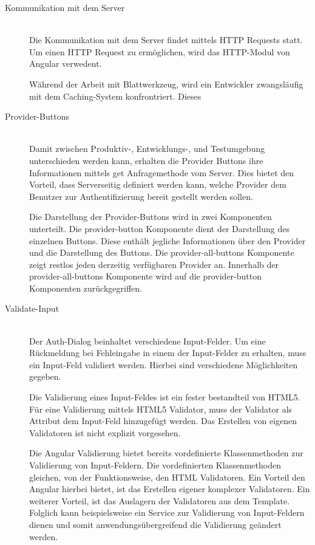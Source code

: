 \begin{description}
	\item[Kommunikation mit dem Server]\hfill\\
	Die Kommunikation mit dem Server findet mittels \gls{HTTP} Requests statt. Um einen \gls{HTTP} Request zu ermöglichen, wird das \gls{HTTP}-Modul von Angular verwedent.
	
	Während der Arbeit mit Blattwerkzeug, wird ein Entwickler zwangsläufig mit dem Caching-System konfrontriert. Dieses 
	
	
	\item[Provider-Buttons]\hfill\\
	Damit zwischen Produktiv-, Entwicklungs-, und Testumgebung unterschieden werden kann, erhalten die Provider Buttons ihre Informationen mittels get Anfragemethode vom Server. Dies bietet den Vorteil, dass Serverseitig definiert werden kann, welche Provider dem Benutzer zur Authentifizierung bereit gestellt werden sollen.
	
	Die Darstellung der Provider-Buttons wird in zwei Komponenten unterteilt. Die provider-button Komponente dient der Darstellung des einzelnen Buttons. Diese enthält jegliche Informationen über den Provider und die Darstellung des Buttons. Die provider-all-buttons Komponente zeigt restlos jeden derzeitig verfügbaren Provider an. Innerhalb der provider-all-buttons Komponente wird auf die provider-button Komponenten zurückgegriffen. 
	\item[Validate-Input]\hfill\\
	Der Auth-Dialog beinhaltet verschiedene Input-Felder. Um eine Rückmeldung bei Fehleingabe in einem der Input-Felder zu erhalten, muss ein Input-Feld validiert werden. Hierbei sind verschiedene Möglichkeiten gegeben. 

	Die Validierung eines Input-Feldes ist ein fester bestandteil von \gls{HTML}5. Für eine Validierung mittels \gls{HTML}5 Validator, muss der Validator als Attribut dem Input-Feld hinzugefügt werden. Das Erstellen von eigenen Validatoren ist nicht explizit vorgesehen.
	
	Die Angular Validierung bietet bereits vordefinierte Klassenmethoden zur Validierung von Input-Feldern. Die vordefinierten Klassenmethoden gleichen, von der Funktionsweise, den HTML Validatoren. Ein Vorteil den Angular hierbei bietet, ist das Erstellen eigener komplexer Validatoren. Ein weiterer Vorteil, ist das Auslagern der Validatoren aus dem Template. Folglich kann beispielsweise ein Service zur Validierung von Input-Feldern dienen und somit anwendungsübergreifend die Validierung geändert werden.
	

\end{description}
